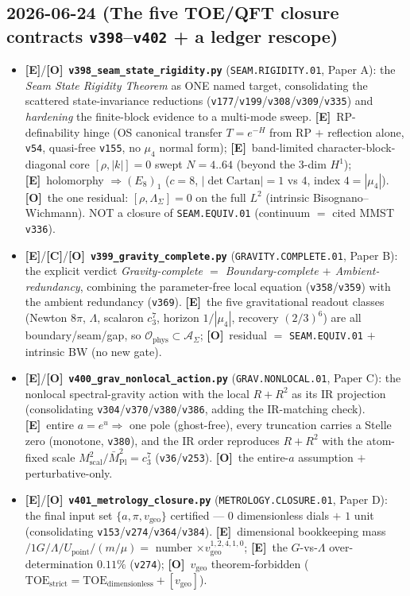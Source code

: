 \documentclass[11pt]{article}
\providecommand{\mE}{\textbf{[E]}}\providecommand{\mC}{\textbf{[C]}}
\providecommand{\mO}{\textbf{[O]}}\providecommand{\mX}{\textbf{[X]}}
\providecommand{\vref}[1]{\texttt{#1}}
\providecommand{\cthree}{c_3}\providecommand{\phiz}{\varphi_0^{\mathrm{ret}}}
\providecommand{\Mbar}{\bar M_{\mathrm{Pl}}}\providecommand{\Z}{\mathbb{Z}}\providecommand{\PP}{\mathbb{P}}
\begin{document}
\subsection*{2026-06-24 (The five TOE/QFT closure contracts \texttt{v398}--\texttt{v402} + a ledger rescope)}
\begin{itemize}
\item \mE/\mO\ \textbf{\texttt{v398\_seam\_state\_rigidity.py}} (\texttt{SEAM.RIGIDITY.01}, Paper A): the \emph{Seam State Rigidity Theorem} as ONE named target, consolidating the scattered state-invariance reductions (\vref{v177}/\vref{v199}/\vref{v308}/\vref{v309}/\vref{v335}) and \emph{hardening} the finite-block evidence to a multi-mode sweep. \mE\ RP-definability hinge (OS canonical transfer $T{=}e^{-H}$ from RP $+$ reflection alone, \vref{v54}, quasi-free \vref{v155}, no $\mu_4$ normal form); \mE\ band-limited character-block-diagonal core $[\rho,|k|]{=}0$ swept $N{=}4..64$ (beyond the $3$-dim $H^1$); \mE\ holomorphy $\Rightarrow(E_8)_1$ ($c{=}8$, $|\!\det\mathrm{Cartan}|{=}1$ vs $4$, index $4{=}|\mu_4|$). \mO\ the one residual: $[\rho,\Lambda_\Sigma]{=}0$ on the full $L^2$ (intrinsic Bisognano--Wichmann). NOT a closure of \texttt{SEAM.EQUIV.01} (continuum $=$ cited MMST \vref{v336}).
\item \mE/\mC/\mO\ \textbf{\texttt{v399\_gravity\_complete.py}} (\texttt{GRAVITY.COMPLETE.01}, Paper B): the explicit verdict \emph{Gravity-complete $=$ Boundary-complete $+$ Ambient-redundancy}, combining the parameter-free local equation (\vref{v358}/\vref{v359}) with the ambient redundancy (\vref{v369}). \mE\ the five gravitational readout classes (Newton $8\pi$, $\Lambda$, scalaron $\cthree^7$, horizon $1/|\mu_4|$, recovery $(2/3)^6$) are all boundary/seam/gap, so $\mathcal O_{\mathrm{phys}}\subset\mathcal A_\Sigma$; \mO\ residual $=$ \texttt{SEAM.EQUIV.01} $+$ intrinsic BW (no new gate).
\item \mE/\mO\ \textbf{\texttt{v400\_grav\_nonlocal\_action.py}} (\texttt{GRAV.NONLOCAL.01}, Paper C): the nonlocal spectral-gravity action with the local $R{+}R^2$ as its IR projection (consolidating \vref{v304}/\vref{v370}/\vref{v380}/\vref{v386}, adding the IR-matching check). \mE\ entire $a{=}e^u\Rightarrow$ one pole (ghost-free), every truncation carries a Stelle zero (monotone, \vref{v380}), and the IR order reproduces $R{+}R^2$ with the atom-fixed scale $M_{\mathrm{scal}}^2/\Mbar^2{=}\cthree^7$ (\vref{v36}/\vref{v253}). \mO\ the entire-$a$ assumption $+$ perturbative-only.
\item \mE/\mO\ \textbf{\texttt{v401\_metrology\_closure.py}} (\texttt{METROLOGY.CLOSURE.01}, Paper D): the final input set $\{a,\pi,v_{\mathrm{geo}}\}$ certified --- $0$ dimensionless dials $+$ $1$ unit (consolidating \vref{v153}/\vref{v274}/\vref{v364}/\vref{v384}). \mE\ dimensional bookkeeping mass$/1G/\Lambda/U_{\mathrm{point}}/(m/\mu){=}$ number $\times v_{\mathrm{geo}}^{1,2,4,1,0}$; \mE\ the $G$-vs-$\Lambda$ over-determination $0.11\%$ (\vref{v274}); \mO\ $v_{\mathrm{geo}}$ theorem-forbidden ($\mathrm{TOE}_{\mathrm{strict}}{=}\mathrm{TOE}_{\mathrm{dimensionless}}{+}[v_{\mathrm{geo}}]$).

\end{itemize}
\end{document}
